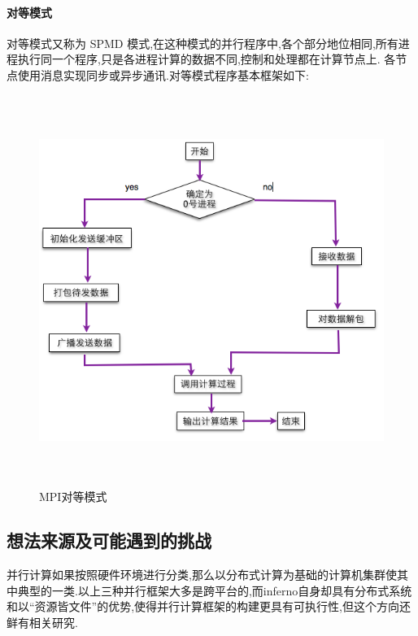 \documentclass[paper=a4]{ctexart} %
\numberwithin{equation}{section} %
\numberwithin{figure}{section} %
\numberwithin{table}{section} %
\newcommand{\n}{\\\indent}
\begin{document}
\paragraph{对等模式}
对等模式又称为 SPMD 模式,在这种模式的并行程序中,各个部分地位相同,所有进程执行同一个程序,只是各进程计算的数据不同,控制和处理都在计算节点上. 各节点使用消息实现同步或异步通讯.对等模式程序基本框架如下:
\begin{figure}[htbp]
\centering
\includegraphics[width=4.8in,height=5in]{pic/MPI-equal-mode.png}
\caption{MPI对等模式}
\end{figure}


\subsection{想法来源及可能遇到的挑战}
并行计算如果按照硬件环境进行分类,那么以分布式计算为基础的计算机集群使其中典型的一类.以上三种并行框架大多是跨平台的,而inferno自身却具有分布式系统和以“资源皆文件”的优势,使得并行计算框架的构建更具有可执行性,但这个方向还鲜有相关研究.\n
\end{document}
